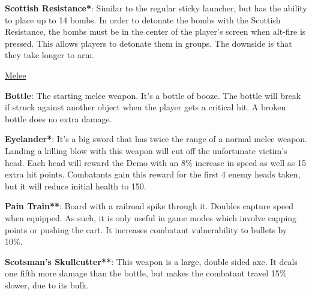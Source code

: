 {\bf Scottish Resistance*}: Similar to the regular sticky launcher, but has the ability to place up to 14 bombs. In order to detonate the bombs with the Scottish Resistance, the bombs must be in the center of the player's screen when alt-fire is pressed. This allows players to detonate them in groups. The downside is that they take longer to arm.

\newpage

\begin {center}
\underline {Melee}
\end {center}

{\bf Bottle}: The starting melee weapon. It's a bottle of booze. The bottle will break if struck against another object when the player gets a critical hit. A broken bottle does no extra damage.

{\bf Eyelander*}: It's a big sword that has twice the range of a normal melee weapon. Landing a killing blow with this weapon will cut off the unfortunate victim's head. Each head will reward the Demo with an 8\% increase in speed as well as 15 extra hit points. Combatants gain this reward for the first 4 enemy heads taken, but it will reduce initial health to 150.

{\bf Pain Train**}: Board with a railroad spike through it. Doubles capture speed when equipped. As such, it is only useful in game modes which involve capping points or pushing the cart. It increases combatant vulnerability to bullets by 10\%.

{\bf Scotsman's Skullcutter**}: This weapon is a large, double sided axe.  It deals one fifth more damage than the bottle, but makes the combatant travel 15\% slower, due to its bulk.


